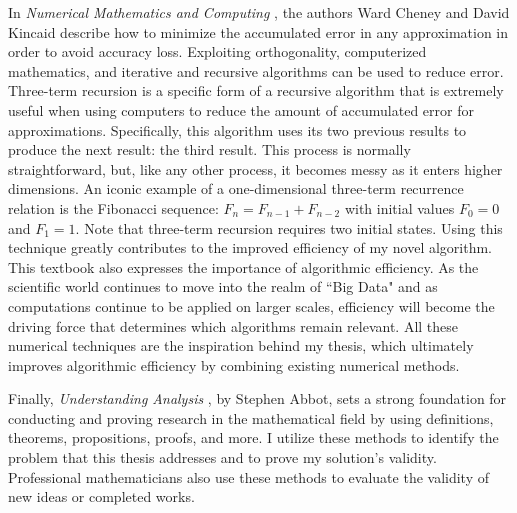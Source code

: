 \documentclass[letterpaper, 12pt]{article}
\begin{document}
In \textit{Numerical Mathematics and Computing} \cite{chk}, the authors Ward Cheney and David Kincaid describe how to minimize the accumulated error in any approximation in order to avoid accuracy loss. Exploiting orthogonality, computerized mathematics, and iterative and recursive algorithms can be used to reduce error. Three-term recursion is a specific form of a recursive algorithm that is extremely useful when using computers to reduce the amount of accumulated error for approximations. Specifically, this algorithm uses its two previous results to produce the next result: the third result. This process is normally straightforward, but, like any other process, it becomes messy as it enters higher dimensions. An iconic example of a one-dimensional three-term recurrence relation is the Fibonacci sequence: $F_n = F_{n-1} + F_{n-2}$ with initial values $F_0 = 0$ and $F_1 = 1$. Note that three-term recursion requires two initial states. Using this technique greatly contributes to the improved efficiency of my novel algorithm. This textbook also expresses the importance of algorithmic efficiency. As the scientific world continues to move into the realm of ``Big Data" and as computations continue to be applied on larger scales, efficiency will become the driving force that determines which algorithms remain relevant. All these numerical techniques are the inspiration behind my thesis, which ultimately improves algorithmic efficiency by combining existing numerical methods. 

Finally, \textit{Understanding Analysis} \cite{abb}, by Stephen Abbot, sets a strong foundation for conducting and proving research in the mathematical field by using definitions, theorems, propositions, proofs, and more. I utilize these methods to identify the problem that this thesis addresses and to prove my solution's validity. Professional mathematicians also use these methods to evaluate the validity of new ideas or completed works.
\end{document}
